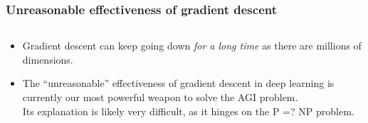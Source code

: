 \documentclass[16pt]{beamer}
\begin{document}
\begin{frame}
	\frametitle{Unreasonable effectiveness of gradient descent}
	
	\begin{columns}
		\begin{column}{0.8\textwidth}
			\begin{itemize}
			\item Gradient descent can keep going down \textit{for a long time} as there are millions of dimensions.
			\item The ``unreasonable'' effectiveness of gradient descent in deep learning is currently our most powerful weapon to solve the AGI problem.  \\
			Its explanation is likely very difficult, as it hinges on the P =? NP problem.
			\end{itemize}
		\end{column}


\end{columns}
\end{frame}
\end{document}
